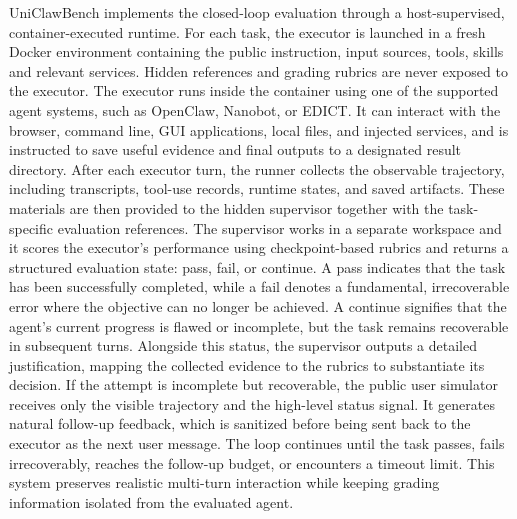 UniClawBench implements the closed-loop evaluation through a host-supervised, container-executed runtime. For each task, the executor is launched in a fresh Docker environment containing the public instruction, input sources, tools, skills and relevant services. Hidden references and grading rubrics are never exposed to the executor. The executor runs inside the container using one of the supported agent systems, such as OpenClaw, Nanobot, or EDICT. It can interact with the browser, command line, GUI applications, local files, and injected services, and is instructed to save useful evidence and final outputs to a designated result directory. After each executor turn, the runner collects the observable trajectory, including transcripts, tool-use records, runtime states, and saved artifacts. These materials are then provided to the hidden supervisor together with the task-specific evaluation references. The supervisor works in a separate workspace and it scores the executor's performance using checkpoint-based rubrics and returns a structured evaluation state: pass, fail, or continue. A pass indicates that the task has been successfully completed, while a fail denotes a fundamental, irrecoverable error where the objective can no longer be achieved. A continue signifies that the agent's current progress is flawed or incomplete, but the task remains recoverable in subsequent turns. Alongside this status, the supervisor outputs a detailed justification, mapping the collected evidence to the rubrics to substantiate its decision. If the attempt is incomplete but recoverable, the public user simulator receives only the visible trajectory and the high-level status signal. It generates natural follow-up feedback, which is sanitized before being sent back to the executor as the next user message. The loop continues until the task passes, fails irrecoverably, reaches the follow-up budget, or encounters a timeout limit. This system preserves realistic multi-turn interaction while keeping grading information isolated from the evaluated agent.